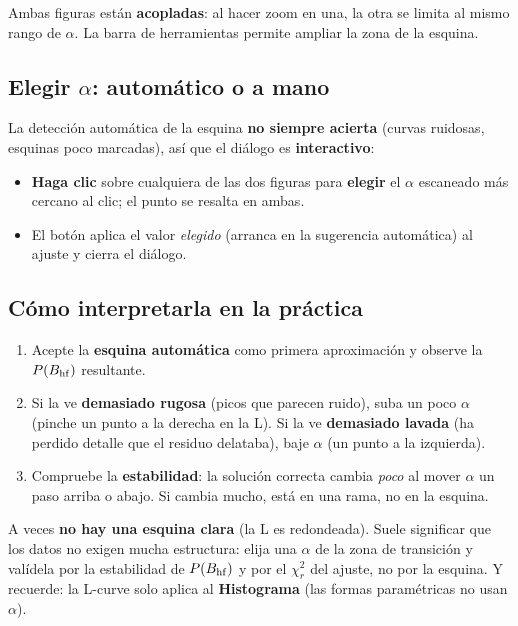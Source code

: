Ambas figuras están \textbf{acopladas}: al hacer zoom en una, la otra se limita al
mismo rango de $\alpha$. La barra de herramientas permite ampliar la zona de la
esquina.


\subsection{Elegir $\alpha$: automático o a mano}

La detección automática de la esquina \textbf{no siempre acierta} (curvas ruidosas,
esquinas poco marcadas), así que el diálogo es \textbf{interactivo}:

\begin{itemize}[nosep]
  \item \textbf{Haga clic} sobre cualquiera de las dos figuras para \textbf{elegir}
        el $\alpha$ escaneado más cercano al clic; el punto se resalta en ambas.
  \item El botón  aplica el valor \emph{elegido} (arranca en
        la sugerencia automática) al ajuste y cierra el diálogo.
\end{itemize}

\subsection{Cómo interpretarla en la práctica}

\begin{enumerate}[nosep]
  \item Acepte la \textbf{esquina automática} como primera aproximación y observe
        la $P(B_{\mathrm{hf}})$ resultante.
  \item Si la ve \textbf{demasiado rugosa} (picos que parecen ruido), suba un poco
        $\alpha$ (pinche un punto a la derecha en la L). Si la ve
        \textbf{demasiado lavada} (ha perdido detalle que el residuo delataba),
        baje $\alpha$ (un punto a la izquierda).
  \item Compruebe la \textbf{estabilidad}: la solución correcta cambia \emph{poco}
        al mover $\alpha$ un paso arriba o abajo. Si cambia mucho, está en una
        rama, no en la esquina.
\end{enumerate}

\begin{aviso}
A veces \textbf{no hay una esquina clara} (la L es redondeada). Suele significar
que los datos no exigen mucha estructura: elija una $\alpha$ de la zona de
transición y valídela por la estabilidad de $P(B_{\mathrm{hf}})$ y por el $\chi^2_r$ del
ajuste, no por la esquina. Y recuerde: la L-curve solo aplica al \textbf{Histograma}
(las formas paramétricas no usan $\alpha$).
\end{aviso}

